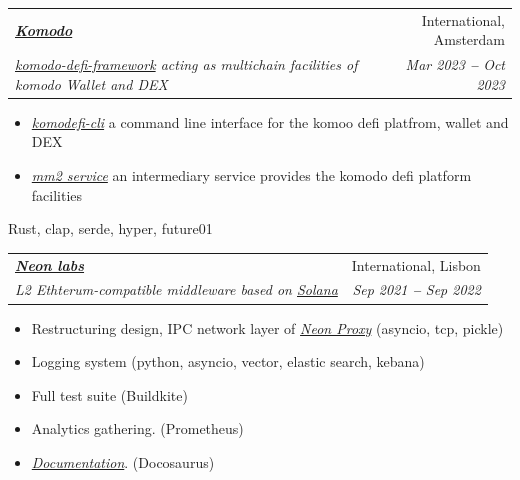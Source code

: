 \documentclass[letterpaper,11pt]{article}
\makeatletter
\newcommand{\resumeItem}[1]{
  \item\small{
    {#1 \vspace{-2pt}}
  }
}
\newcommand{\resumeSubheading}[4]{
  \vspace{-2pt}\item
    \begin{tabular*}{0.97\textwidth}[t]{l@{\extracolsep{\fill}}r}
      \textbf{#1} & #2 \\
      \textit{\small#3} & \textit{\small #4} \\
    \end{tabular*}\vspace{-7pt}
}
\newcommand{\resumeItemListStart}{\begin{itemize}}
\newcommand{\resumeItemListEnd}{\end{itemize}\vspace{-5pt}}
\makeatother
\begin{document}
    \resumeSubheading
        {\emph{\href{http://komodoproject.com/}{\color{blue}Komodo}}}{International, Amsterdam}
        {\emph{\href{https://github.com/KomodoPlatform/komodo-defi-framework/}{\color{blue} komodo-defi-framework}} acting as multichain facilities of komodo Wallet and DEX}{Mar 2023 \textbf{--} Oct 2023} 
        \resumeItemListStart
            \resumeItem{\emph{\href{https://github.com/KomodoPlatform/komodo-defi-framework/tree/dev/mm2src/adex_cli}{\color{blue}komodefi-cli}} a command line interface for the komoo defi platfrom, wallet and DEX }
            \resumeItem{\emph{\href{https://github.com/KomodoPlatform/komodo-defi-framework/tree/dev/mm2src/adex_cli}{\color{blue}mm2 service}} an intermediary service provides the komodo defi platform facilities }
        \resumeItemListEnd
        Rust, clap, serde, hyper, future01




    \resumeSubheading
      {\emph{\href{http://neonlabs.org/}{\color{blue}Neon labs}}}{International, Lisbon}
      {L2 Ethterum-compatible middleware based on \emph{\href{https://solana.com}{\color{blue}Solana}}}{Sep 2021 \textbf{--} Sep 2022}
        \resumeItemListStart
            \resumeItem{ Restructuring design, IPC network layer of \emph{\href{https://github.com/neonlabsorg/proxy-model.py}{\color{blue}Neon Proxy}} (asyncio, tcp, pickle) }
            \resumeItem{ Logging system (python, asyncio, vector, elastic search, kebana) }
            \resumeItem{ Full test suite (Buildkite)}
            \resumeItem{ Analytics gathering. (Prometheus)}
            \resumeItem{ \emph{\href{https://docs.neonlabs.org}{\color{blue}Documentation}}. (Docosaurus)}
        \resumeItemListEnd
\end{document}
